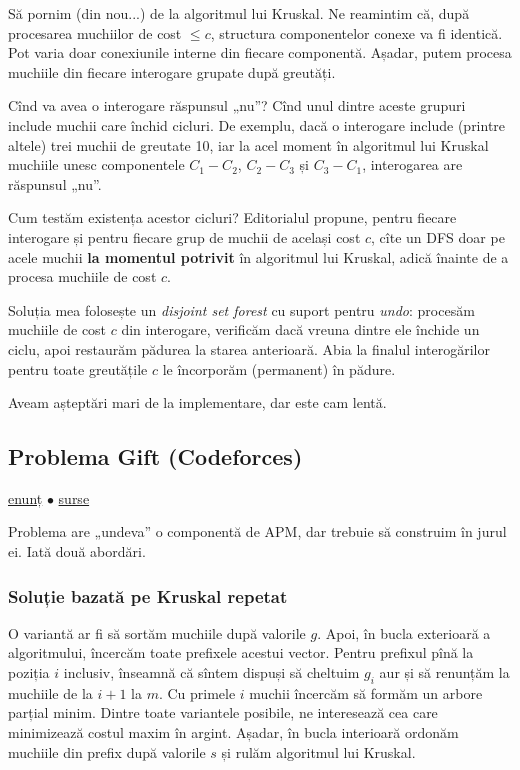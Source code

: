 \documentclass[../main.tex]{subfiles}
\begin{document}
Să pornim (din nou...) de la algoritmul lui Kruskal. Ne reamintim că, după procesarea muchiilor de cost $\leq c$, structura componentelor conexe va fi identică. Pot varia doar conexiunile interne din fiecare componentă. Așadar, putem procesa muchiile din fiecare interogare grupate după greutăți.

Cînd va avea o interogare răspunsul „nu”? Cînd unul dintre aceste grupuri include muchii care închid cicluri. De exemplu, dacă o interogare include (printre altele) trei muchii de greutate 10, iar la acel moment în algoritmul lui Kruskal muchiile unesc componentele $C_1 - C_2$, $C_2 - C_3$ și $C_3 - C_1$, interogarea are răspunsul „nu”.

Cum testăm existența acestor cicluri? Editorialul propune, pentru fiecare interogare și pentru fiecare grup de muchii de același cost $c$, cîte un DFS doar pe acele muchii \textbf{la momentul potrivit} în algoritmul lui Kruskal, adică înainte de a procesa muchiile de cost $c$.

Soluția mea folosește un \textit{disjoint set forest} cu suport pentru \textit{undo}: procesăm muchiile de cost $c$ din interogare, verificăm dacă vreuna dintre ele închide un ciclu, apoi restaurăm pădurea la starea anterioară. Abia la finalul interogărilor pentru toate greutățile $c$ le încorporăm (permanent) în pădure.

Aveam așteptări mari de la implementare, dar este cam lentă. 

\subsection{Problema Gift (Codeforces)}
\label{problem:gift}

\href{https://codeforces.com/contest/76/problem/A}{enunț}
$\bullet$
\hyperref[code:gift]{surse}

Problema are „undeva” o componentă de APM, dar trebuie să construim în jurul ei. Iată două abordări.

\subsubsection*{Soluție bazată pe Kruskal repetat}

O variantă ar fi să sortăm muchiile după valorile $g$. Apoi, în bucla exterioară a algoritmului, încercăm toate prefixele acestui vector. Pentru prefixul pînă la poziția $i$ inclusiv, înseamnă că sîntem dispuși să cheltuim $g_i$ aur și să renunțăm la muchiile de la $i+1$ la $m$. Cu primele $i$ muchii încercăm să formăm un arbore parțial minim. Dintre toate variantele posibile, ne interesează cea care minimizează costul maxim în argint. Așadar, în bucla interioară ordonăm muchiile din prefix după valorile $s$ și rulăm algoritmul lui Kruskal.
\end{document}
